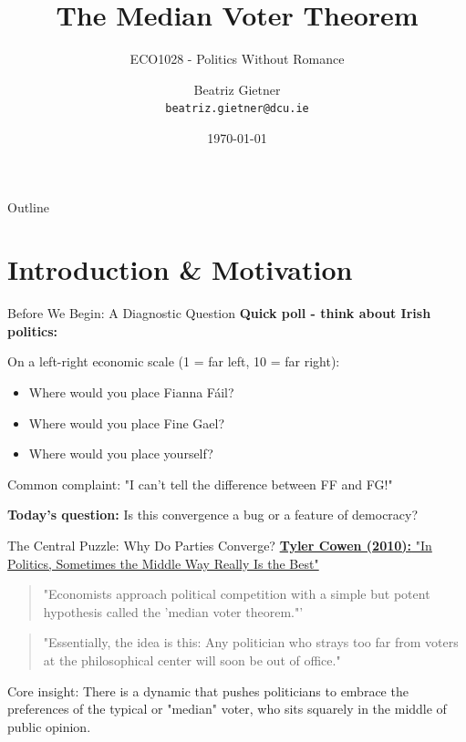 \documentclass[10pt]{beamer}
\title{The Median Voter Theorem}
\subtitle{ECO1028 - Politics Without Romance}
\author{Beatriz Gietner\\
\texttt{beatriz.gietner@dcu.ie}}
\date{\today}
\begin{document}
\maketitle

\begin{frame}{Outline}
\tableofcontents
\end{frame}


\section{Introduction \& Motivation}

\begin{frame}{Before We Begin: A Diagnostic Question}
\textbf{Quick poll - think about Irish politics:}


On a left-right economic scale (1 = far left, 10 = far right):
\begin{itemize}
\item Where would you place Fianna Fáil?
\item Where would you place Fine Gael?
\item Where would you place yourself?
\end{itemize}



\alert{Common complaint:} "I can't tell the difference between FF and FG!"



\textbf{Today's question:} Is this convergence a bug or a feature of democracy?
\end{frame}

\begin{frame}{The Central Puzzle: Why Do Parties Converge?}
\href{http://www.nytimes.com/2010/02/07/business/economy/07view.html}{\alert{\textbf{Tyler Cowen (2010):} "In Politics, Sometimes the Middle Way Really Is the Best"}}


\begin{quote}
"Economists approach political competition with a simple but potent hypothesis called the 'median voter theorem."'
\end{quote}



\begin{quote}
"Essentially, the idea is this: Any politician who strays too far from voters at the philosophical center will soon be out of office."
\end{quote}



\alert{Core insight:} There is a dynamic that pushes politicians to embrace the preferences of the typical or "median" voter, who sits squarely in the middle of public opinion.
\end{frame}
\end{document}
